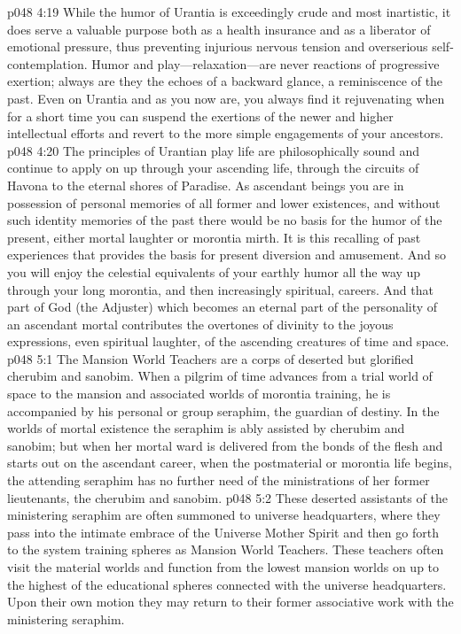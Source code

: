\pc \vs p048 4:19 While the humor of Urantia is exceedingly crude and most inartistic, it does serve a valuable purpose both as a health insurance and as a liberator of emotional pressure, thus preventing injurious nervous tension and overserious self\hyp{}contemplation. Humor and play---relaxation---are never reactions of progressive exertion; always are they the echoes of a backward glance, a reminiscence of the past. Even on Urantia and as you now are, you always find it rejuvenating when for a short time you can suspend the exertions of the newer and higher intellectual efforts and revert to the more simple engagements of your ancestors.
\vs p048 4:20 The principles of Urantian play life are philosophically sound and continue to apply on up through your ascending life, through the circuits of Havona to the eternal shores of Paradise. As ascendant beings you are in possession of personal memories of all former and lower existences, and without such identity memories of the past there would be no basis for the humor of the present, either mortal laughter or morontia mirth. It is this recalling of past experiences that provides the basis for present diversion and amusement. And so you will enjoy the celestial equivalents of your earthly humor all the way up through your long morontia, and then increasingly spiritual, careers. And that part of God (the Adjuster) which becomes an eternal part of the personality of an ascendant mortal contributes the overtones of divinity to the joyous expressions, even spiritual laughter, of the ascending creatures of time and space.
\vs p048 5:1 The Mansion World Teachers are a corps of deserted but glorified cherubim and sanobim. When a pilgrim of time advances from a trial world of space to the mansion and associated worlds of morontia training, he is accompanied by his personal or group seraphim, the guardian of destiny. In the worlds of mortal existence the seraphim is ably assisted by cherubim and sanobim; but when her mortal ward is delivered from the bonds of the flesh and starts out on the ascendant career, when the postmaterial or morontia life begins, the attending seraphim has no further need of the ministrations of her former lieutenants, the cherubim and sanobim.
\vs p048 5:2 These deserted assistants of the ministering seraphim are often summoned to universe headquarters, where they pass into the intimate embrace of the Universe Mother Spirit and then go forth to the system training spheres as Mansion World Teachers. These teachers often visit the material worlds and function from the lowest mansion worlds on up to the highest of the educational spheres connected with the universe headquarters. Upon their own motion they may return to their former associative work with the ministering seraphim.
